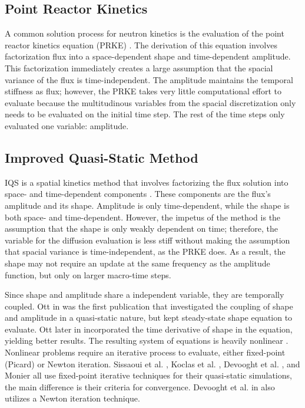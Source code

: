 \subsection{Point Reactor Kinetics}

A common solution process for neutron kinetics is the evaluation of the point reactor kinetics equation (PRKE) \cite{Planchard_1991}.  The derivation of this equation involves factorization flux into a space-dependent shape and time-dependent amplitude.  This factorization immediately creates a large assumption that the spacial variance of the flux is time-independent.  The amplitude maintains the temporal stiffness as flux; however, the PRKE takes very little computational effort to evaluate because the multitudinous variables from the spacial discretization only needs to be evaluated on the initial time step.  The rest of the time steps only evaluated one variable: amplitude.


\subsection{Improved Quasi-Static Method}

IQS is a spatial kinetics method that involves factorizing the flux solution into space- and time-dependent components \cite{Ott_1966,Dulla2008,Devooght_1984,Monier_diss,Sissaoui_1995}.  These components are the flux's amplitude and its shape. Amplitude is only time-dependent, while the shape is both space- and time-dependent.  However, the impetus of the method is the assumption that the shape is only weakly dependent on time; therefore, the variable for the diffusion evaluation is less stiff without making the assumption that spacial variance is time-independent, as the PRKE does.  As a result, the shape may not require an update at the same frequency as the amplitude function, but only on larger macro-time steps.  

Since shape and amplitude share a independent variable, they are temporally coupled. Ott in \cite{Ott_1966} was the first publication that investigated the coupling of shape and amplitude in a quasi-static nature, but kept steady-state shape equation to evaluate. Ott later in \cite{Ott_1969} incorporated the time derivative of shape in the equation, yielding better results.  The resulting system of equations is heavily nonlinear \cite{Dulla2008}. Nonlinear problems require an iterative process to evaluate, either fixed-point (Picard) or Newton iteration. Sissaoui et al. \cite{Sissaoui_1995}, Koclas et al. \cite{Koclas_1996}, Devooght et al. \cite{Devooght_1984}, and Monier \cite{Monier_diss} all use fixed-point iterative techniques for their quasi-static simulations, the main difference is their criteria for convergence.  Devooght et al. in \cite{Devooght_1984} also utilizes a Newton iteration technique.

